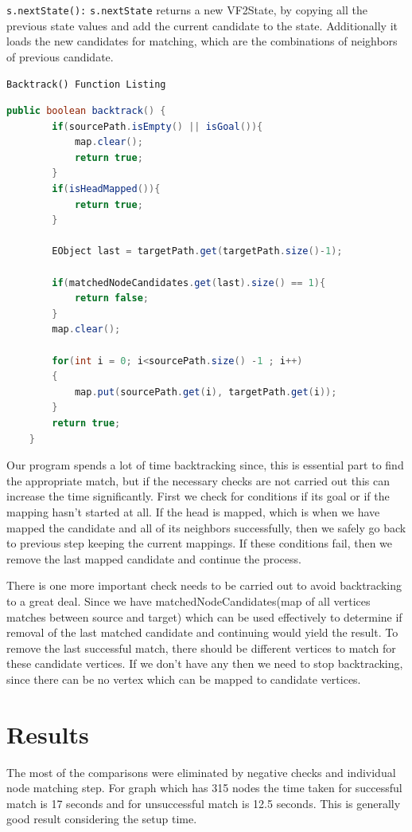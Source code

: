 \texttt{s.nextState():}
\texttt{s.nextState} returns a new VF2State, by copying all the previous state values and add the current candidate to the state. Additionally it loads the new candidates for matching, which are the combinations of neighbors of previous candidate. 
 
\texttt{Backtrack() Function Listing}
\begin{lstlisting}[language = Java,frame = single]
public boolean backtrack() {
		if(sourcePath.isEmpty() || isGoal()){
			map.clear();
			return true;
		}
		if(isHeadMapped()){
			return true;
		}
	
		EObject last = targetPath.get(targetPath.size()-1);
	
		if(matchedNodeCandidates.get(last).size() == 1){
			return false;
		}
		map.clear();
		
		for(int i = 0; i<sourcePath.size() -1 ; i++)
		{
			map.put(sourcePath.get(i), targetPath.get(i));
		}
		return true;
	}
\end{lstlisting}
Our program spends a lot of time backtracking since, this is essential part to find the appropriate match, but if the necessary checks are not carried out this can increase the time significantly. 
First we check for conditions if its goal or if the mapping hasn't started at all. 
If the head is mapped, which is when we have mapped the candidate and all of its neighbors successfully, then we safely go back to previous step keeping the current mappings. 
If these conditions fail, then we remove the last mapped candidate and continue the process.

There is one more important check needs to be carried out to avoid backtracking to a great deal. Since we have matchedNodeCandidates(map of all vertices matches between source and target) which can be used effectively to determine if removal of the last matched candidate and continuing would yield the result. To remove the last successful match, there should be different vertices to match for these candidate vertices. If we don't have any then we need to stop backtracking, since there can be no vertex which can be mapped to candidate vertices.

\section{Results}
The most of the comparisons were eliminated by negative checks and individual node matching step. For graph which has 315 nodes the time taken for successful match is 17 seconds and for unsuccessful match is 12.5 seconds. This is generally good result considering the setup time.

